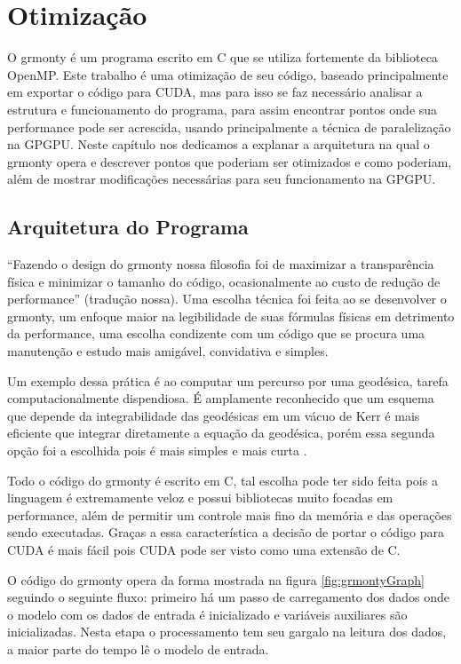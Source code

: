 \chapter{Otimização}
\label{cap:otimizacao}
  O grmonty é um programa escrito em C que se utiliza fortemente da biblioteca OpenMP.
  Este trabalho é uma otimização de seu código, baseado principalmente em exportar
  o código para CUDA, mas para isso se faz necessário analisar a estrutura e
  funcionamento do programa, para assim encontrar pontos onde sua performance
  pode ser acrescida, usando principalmente a técnica de paralelização na GPGPU.
  Neste capítulo nos dedicamos a explanar a arquitetura na qual o grmonty opera
  e descrever pontos que poderiam ser otimizados e como poderiam, além de mostrar
  modificações necessárias para seu funcionamento na GPGPU.

\section{Arquitetura do Programa}
  ``Fazendo o design do grmonty nossa filosofia foi de maximizar a transparência
  física e minimizar o tamanho do código, ocasionalmente ao custo de redução de
  performance'' \citep{Dolence:09} (tradução nossa). Uma escolha técnica foi feita
  ao se desenvolver o grmonty, um enfoque maior na legibilidade de suas fórmulas
  físicas em detrimento da performance, uma escolha condizente com um
  código que se procura uma manutenção e estudo mais amigável, convidativa e simples.

  Um exemplo dessa prática é ao computar um percurso por uma geodésica, tarefa
  computacionalmente dispendiosa. É amplamente reconhecido \citep{ynogkm:13} que
  um esquema que depende da integrabilidade das geodésicas em um vácuo de Kerr é
  mais eficiente que integrar diretamente a equação da geodésica, porém essa segunda
  opção foi a escolhida pois é mais simples e mais curta \citep{Dolence:09}.

  Todo o código do grmonty é escrito em C, tal escolha pode ter sido feita pois
  a linguagem é extremamente veloz e possui bibliotecas muito focadas em performance, além de permitir um controle mais fino da memória e das
  operações sendo executadas. Graças a essa característica a decisão de portar o
  código para CUDA é mais fácil pois CUDA pode ser visto como uma extensão de C.

  O código do grmonty opera da forma mostrada na figura \ref{fig:grmontyGraph} seguindo o seguinte fluxo: primeiro há um passo de carregamento dos dados onde o modelo com os dados de entrada é inicializado e variáveis auxiliares são inicializadas. Nesta etapa o processamento tem seu gargalo na leitura dos dados, a maior parte do tempo lê o modelo de entrada.

